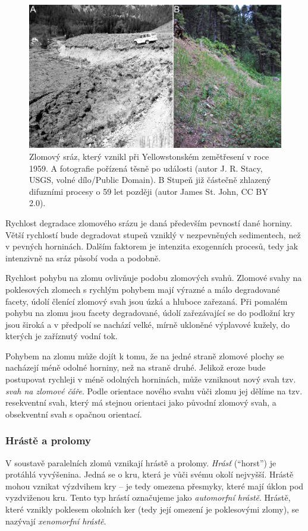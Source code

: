 \begin{figure}[h]
	\centering
	\includegraphics[width=1\linewidth]{obrazky/tectonic/fault_scarp}
	\caption{Zlomový sráz, který vznikl při Yellowstonském zemětřesení v roce 1959. A fotografie pořízená těsně po události (autor J. R. Stacy, USGS, volné dílo/Public Domain). B Stupeň již částečně zhlazený difuzními procesy o 59 let později (autor James St. John, CC BY 2.0).}
	\label{fig:faultscarp}
\end{figure}

Rychlost degradace zlomového srázu je daná především pevností dané horniny. Větší rychlostí bude degradovat stupeň vzniklý v nezpevněných sedimentech, než v pevných horninách. Dalším faktorem je intenzita exogenních procesů, tedy jak intenzivně na sráz působí voda a podobně. 

Rychlost pohybu na zlomu ovlivňuje podobu zlomových svahů. Zlomové svahy na poklesových zlomech s rychlým pohybem mají výrazné a málo degradované facety, údolí členící zlomový svah jsou úzká a hluboce zařezaná. Při pomalém pohybu na zlomu jsou facety degradované, údolí zařezávající se do podložní kry jsou široká a v předpolí se nachází velké, mírně ukloněné výplavové kužely, do kterých je zaříznutý vodní tok. 

Pohybem na zlomu může dojít k tomu, že na jedné straně zlomové plochy se nacházejí méně odolné horniny, než na straně druhé. Jelikož eroze bude postupovat rychleji v méně odolných horninách, může vzniknout nový svah tzv. \emph{svah na zlomové čáře}. Podle orientace nového svahu vůči zlomu jej dělíme na tzv. resekventní svah, který má stejnou orientaci jako původní zlomový svah, a obsekventní svah s opačnou orientací.

\subsubsection{Hrástě a prolomy}
V soustavě paralelních zlomů vznikají hrástě a prolomy. \emph{Hrásť} (\enquote{horst}) je protáhlá vyvýšenina. Jedná se o kru, která je vůči svému okolí nejvyšší. Hrástě mohou vznikat výzdvihem kry -- je tedy omezena přesmyky, které mají úklon pod vyzdviženou kru. Tento typ hrástí označujeme jako \emph{automorfní hrástě}. Hrástě, které vznikly poklesem okolních ker (tedy její omezení je poklesovými zlomy), se nazývají \emph{xenomorfní hrástě}.

